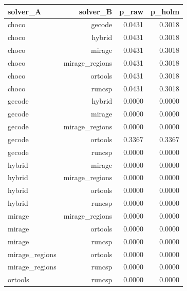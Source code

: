 \begin{table}[t]
{\begin{tabular}{lrrr}
\toprule
solver\_A & solver\_B & p\_raw & p\_holm \\
\midrule
choco & gecode & 0.0431 & 0.3018 \\
choco & hybrid & 0.0431 & 0.3018 \\
choco & mirage & 0.0431 & 0.3018 \\
choco & mirage_regions & 0.0431 & 0.3018 \\
choco & ortools & 0.0431 & 0.3018 \\
choco & runcsp & 0.0431 & 0.3018 \\
gecode & hybrid & 0.0000 & 0.0000 \\
gecode & mirage & 0.0000 & 0.0000 \\
gecode & mirage_regions & 0.0000 & 0.0000 \\
gecode & ortools & 0.3367 & 0.3367 \\
gecode & runcsp & 0.0000 & 0.0000 \\
hybrid & mirage & 0.0000 & 0.0000 \\
hybrid & mirage_regions & 0.0000 & 0.0000 \\
hybrid & ortools & 0.0000 & 0.0000 \\
hybrid & runcsp & 0.0000 & 0.0000 \\
mirage & mirage_regions & 0.0000 & 0.0000 \\
mirage & ortools & 0.0000 & 0.0000 \\
mirage & runcsp & 0.0000 & 0.0000 \\
mirage_regions & ortools & 0.0000 & 0.0000 \\
mirage_regions & runcsp & 0.0000 & 0.0000 \\
ortools & runcsp & 0.0000 & 0.0000 \\
\bottomrule
\end{tabular}}
{}
\end{table}
